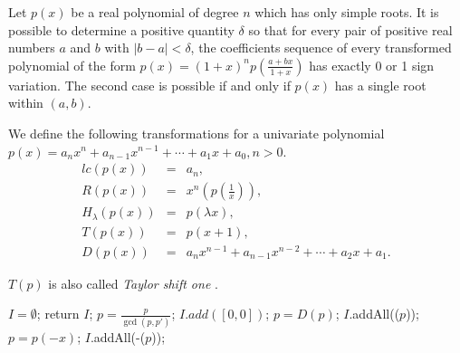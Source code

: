 


\begin{theorem}\label{thm:vin}
  Let $p(x)$ be a real polynomial of degree $n$ which has only simple roots. It is possible to determine a positive quantity $\delta$ so that for every pair of positive real numbers $a$ and $b$ with $|b-a| < \delta$, the coefficients sequence of every transformed polynomial of the form
  $  p(x) = (1+x)^{n}p(\frac{a+bx}{1+x}) $
		  has exactly 0 or 1 sign variation. The second case is possible if and only if $p(x)$ has a single root within $(a,b)$.
\end{theorem}

\begin{definition}  We define the following transformations for a univariate polynomial $p(x)=a_nx^n+a_{n-1}x^{n-1}+\cdots+a_1x+a_0,n>0$.
  \begin{eqnarray*}
  lc(p(x))&=&a_n,\\
  R(p(x))&=&x^n(p(\frac{1}{x})),\\
  H_\lambda(p(x))&=&p(\lambda x),\\
  T(p(x))&=&p(x+1), \\
  D(p(x))&=&a_nx^{n-1}+a_{n-1}x^{n-2}+\cdots+a_2x+a_1.
  \end{eqnarray*}
\end{definition}

$T(p)$  is also called	{\em Taylor shift one} \cite{ger04,joh05}.

\begin{algorithm}
\caption{\algm \label{alg:main}}
\DontPrintSemicolon
{}
$I=\emptyset$; \;
  {return $I$;}
$p=\frac{p}{\gcd(p,p')}$; 
 { $I.add([0,0])$; 
$p=D(p)$; 
}
$I$.addAll(\algcf($p$)); \;
 
$p=p(-x)$;\;
$I$.addAll(-\algcf($p$));
\end{algorithm}


